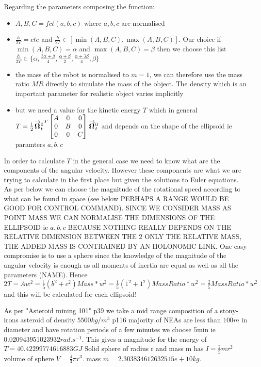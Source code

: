 Regarding the parameters composing the function:
\begin{itemize}
	\item $A,B,C=fct(a,b,c)$ where $a,b,c$ are normalised
	\item $\frac{h}{2T}=cte$ and $\frac{h}{2T} \in [\min(A,B,C), \max(A,B,C)]$. Our choice if $\min(A,B,C)=\alpha$ and $\max(A,B,C)=\beta$ then we choose this list $\frac{h}{2T} \in \{\alpha, \frac{3\alpha+\beta}{4}, \frac{\alpha+\beta}{2}, \frac{\alpha + 3\beta}{4}, \beta\}$
	\item the mass of the robot is normalised to $m=1$, we can therefore use the mass ratio $MR$ directly to simulate the mass of the object. The density which is an important parameter for realistic object varies implicitly
	\item but we need a value for the kinetic energy $T$ which in general $T=\frac{1}{2}{\overrightarrow{\bf \Omega}^{0}_{t}}^{T}\begin{bmatrix}
	A&0&0\\0&B&0\\0&0&C
	\end{bmatrix}\overrightarrow{\bf \Omega}^{0}_{t}$ and depends on the shape of the ellipsoid ie paramters $a,b,c$
\end{itemize}


In order to calculate $T$ in the general case we need to know what are the components of the angular velocity. However these components are what we are trying to calculate in the first place but given the solutions to Euler equations. As per below we can choose the magnitude of the rotational speed according to what can be found in space (see below PERHAPS A RANGE WOULD BE GOOD FOR CONTROL COMMAND). SINCE WE CONSIDER MASS AS POINT MASS WE CAN NORMALISE THE DIMENSIONS OF THE ELLIPSOID ie $a,b,c$ BECAUSE NOTHING REALLY DEPENDS ON THE RELATIVE DIMENSION BETWEEN THE 2 ONLY THE RELATIVE MASS, THE ADDED MASS IS CONTRAINED BY AN HOLONOMIC LINK. One easy compromise is to use a sphere since the knowledge of the magnitude of the angular velocity is enough as all moments of inertia are equal as well as all the parameters (NAME). Hence $2T=Aw^2=\frac{1}{5}(b^2+c^2)Mass*w^2=\frac{1}{5}(1^2+1^2)MassRatio*w^2=\frac{2}{5}MassRatio*w^2$ and this will be calculated for each ellipsoid!


As per "Asteroid mining 101" p39 we take a mid range composition of a stony-irons asteroid of density $5500 kg/m^3$ p116 majority of NEAs are less than $100 m$ in diameter and have rotation periods of a few minutes we choose 5min ie $0.020943951023932 rad.s^{-1}$. This gives a magnitude for the energy of $T=40.42299774616883 GJ$ Solid sphere of radius r and mass m has $I=\frac{2}{5}mr^2$ volume of sphere $V=\frac{4}{3}\pi r^3$. mass $m=2.303834612632515e+10kg$.
